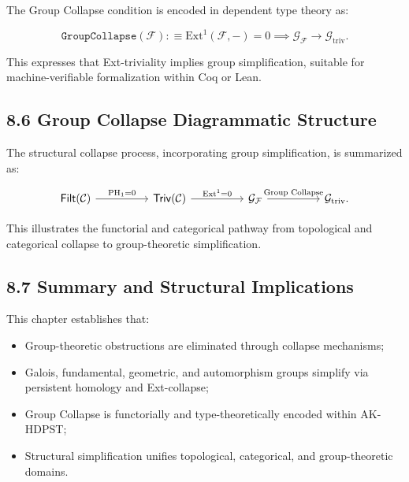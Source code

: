 \documentclass[11pt]{article}
\begin{document}
The Group Collapse condition is encoded in dependent type theory as:

\[
\texttt{GroupCollapse}(\mathcal{F}) :\equiv \mathrm{Ext}^1(\mathcal{F}, -) = 0 \implies \mathcal{G}_{\mathcal{F}} \longrightarrow \mathcal{G}_{\mathrm{triv}}.
\]

This expresses that Ext-triviality implies group simplification, suitable for machine-verifiable formalization within Coq or Lean.

\subsection*{8.6 Group Collapse Diagrammatic Structure}

The structural collapse process, incorporating group simplification, is summarized as:

\[
\begin{tikzcd}[column sep=huge]
\mathsf{Filt}(\mathcal{C}) \arrow[r, "\mathrm{PH}_1 = 0"]
& \mathsf{Triv}(\mathcal{C}) \arrow[r, "\mathrm{Ext}^1 = 0"]
& \mathcal{G}_{\mathcal{F}} \arrow[r, "\text{Group Collapse}"]
& \mathcal{G}_{\mathrm{triv}}.
\end{tikzcd}
\]

This illustrates the functorial and categorical pathway from topological and categorical collapse to group-theoretic simplification.

\subsection*{8.7 Summary and Structural Implications}

This chapter establishes that:

\begin{itemize}
    \item Group-theoretic obstructions are eliminated through collapse mechanisms;
    \item Galois, fundamental, geometric, and automorphism groups simplify via persistent homology and Ext-collapse;
    \item Group Collapse is functorially and type-theoretically encoded within AK-HDPST;
    \item Structural simplification unifies topological, categorical, and group-theoretic domains.
\end{itemize}



\end{document}
